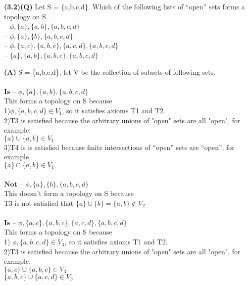 \documentclass[12pt]{article}
\begin{document}
    \begin{flushleft}
        \textbf{(3.2)(Q)} Let S = \{a,b,c,d\}. Which of the following lists of “open” sets forms a topology on S \\
        – $\phi, \{a\}, \{a,b\}, \{a,b,c,d\}$ \\
        – $\phi, \{a\}, \{b\}, \{a,b,c,d\}$ \\
        – $\phi, \{a,c\}, \{a,b,c\}, \{a,c,d\}, \{a,b,c,d\}$ \\
        – $\{a\}, \{a,b\}, \{a,b,c\}, \{a,b,c,d\}$ \\
        \end{flushleft}
        \textbf{(A)}
        S = \{a,b,c,d\}, let V be the collection of subsets of following sets. \\ \\
        $ \textbf{Is}$ – $\phi, \{a\}, \{a,b\}, \{a,b,c,d\}$ \\
        This forms a topology on S because  \\
        1)$\phi, \{a,b,c,d\} \in V_1$, so it satisfies axioms T1 and T2. \\
        2)T3 is satisfied because the arbitrary unions of "open" sets are all "open", for example, \\
        $\{a\} \cup \{a,b\} \in V_1$\\
        3)T4 is is satisfied because finite intersections of “open” sets are “open”, for example, \\
        $\{a\} \cap \{a,b\} \in V_1$\\ \\
        $ \textbf{Not}$ – $\phi, \{a\}, \{b\}, \{a,b,c,d\}$ \\
        This doesn't form a topology on S because  \\
        T3 is not satisfied that $\{a\} \cup \{b\} = \{a,b\} \notin V_2$\\ \\
        $ \textbf{Is}$ – $\phi, \{a,c\}, \{a,b,c\}, \{a,c,d\}, \{a,b,c,d\}$ \\
        This forms a topology on S because  \\
        1) $\phi, \{a,b,c,d\} \in V_3$, so it satisfies axioms T1 and T2. \\
        2)T3 is satisfied because the arbitrary unions of "open" sets are all "open", for example, \\
        $\{a,c\} \cup \{a,b,c\} \in V_3$\\
        $\{a,b,c\} \cup \{a,c,d\} \in V_3$\\
\end{document}
